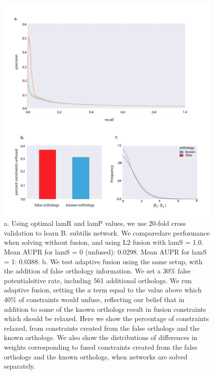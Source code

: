 \documentclass[11pt]{article}
\begin{document}
\pagebreak

\begin{figure}
\begin{center}
  \includegraphics[scale=0.45]{fig5_2.pdf}
  \caption{\label{xspecies-real} a. Using optimal lamR and lamP values, we use 20-fold cross validation to learn B. subtilis network. 
  We comparedare performance when solving without fusion, and using L2 fusion with lamS = 1.0. Mean AUPR for lamS = 0 (unfused): 0.0298. 
  Mean AUPR for lamS = 1: 0.0388. b. We test adaptive fusion using the same setup, with the addition of false orthology information.
  We set a 30\% false potentialsitive rate, including 561 additional orthologs. We run adaptive fusion, setting the $a$ term equal to the value above which 40\% of constraints would unfuse, reflecting our belief that in addition to some of the known orthologs result in fusion constraints which should be relaxed. 
  Here we show the percentage of constraints relaxed, from constraints created from the false orthologs and the known orthologs. 
  We also show the distributions of differences in weights corresponding to fused constraints created from the false orthologs and the known orthologs, when networks are solved separately. }
\end{center}
\end{figure}
\pagebreak
\end{document}
